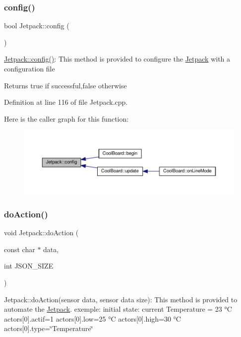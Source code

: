 \subsubsection{\texorpdfstring{config()}{config()}}
{\footnotesize\ttfamily bool Jetpack\+::config (\begin{DoxyParamCaption}{ }\end{DoxyParamCaption})}

\hyperlink{class_jetpack_ab065ee83e244265a2223a22f3ee4a719}{Jetpack\+::config()}\+: This method is provided to configure the \hyperlink{class_jetpack}{Jetpack} with a configuration file

\begin{DoxyReturn}{Returns}
true if successful,false otherwise 
\end{DoxyReturn}


Definition at line 116 of file Jetpack.\+cpp.

Here is the caller graph for this function\+:
\nopagebreak
\begin{figure}[H]
\begin{center}
\leavevmode
\includegraphics[width=350pt]{df/d1d/class_jetpack_ab065ee83e244265a2223a22f3ee4a719_icgraph}
\end{center}
\end{figure}
\mbox{\label{class_jetpack_a86d2e83436ef4b85f4c3a6e85ac785b0}} 
\subsubsection{\texorpdfstring{do\+Action()}{doAction()}}
{\footnotesize\ttfamily void Jetpack\+::do\+Action (\begin{DoxyParamCaption}\item[{const char $\ast$}]{data,  }\item[{int}]{J\+S\+O\+N\+\_\+\+S\+I\+ZE }\end{DoxyParamCaption})}

Jetpack\+::do\+Action(sensor data, sensor data size)\+: This method is provided to automate the \hyperlink{class_jetpack}{Jetpack}. exemple\+: initial state\+: current Temperature = 23 °C actors\mbox{[}0\mbox{]}.actif=1 actors\mbox{[}0\mbox{]}.low=25 °C actors\mbox{[}0\mbox{]}.high=30 °C actors\mbox{[}0\mbox{]}.type=\char`\"{}\+Temperature\char`\"{}

